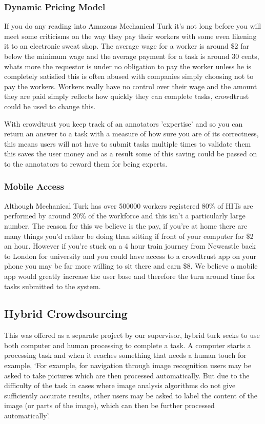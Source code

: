 \documentclass[11pt]{article}
\begin{document}
\subsubsection{Dynamic Pricing Model}
If you do any reading into Amazons Mechanical Turk it's not long before you will meet some criticisms on the way they pay their workers with some
even likening it to an electronic sweat shop. The average wage for a worker is around \$2 far below the minimum wage and the average payment for 
a task is around 30 cents, whats more the requestor is under no obligation to pay the worker unless he is completely satisfied this is often abused
with companies simply choosing not to pay the workers. Workers really have no control over their wage and the amount they are paid simply 
reflects how quickly they can complete tasks, crowdtrust could be used to change this.

With crowdtrust you keep track of an annotators 'expertise' and so you can return an answer to a task with a measure of how sure you are of its
correctness, this means users will not have to submit tasks multiple times to validate them this saves the user money and as a result some of this
saving could be passed on to the annotators to reward them for being experts.   

\subsubsection{Mobile Access}
Although Mechanical Turk has over 500000 workers registered 80\% of HITs are performed by around 20\% of the workforce and this isn't a 
particularly large number. The reason for this we believe is the pay, if you're at home there are many things you'd rather be doing than sitting
if front of your computer for \$2 an hour. However if you're stuck on a 4 hour train journey from Newcastle back to London for university and
you could have access to a crowdtrust app on your phone you may be far more willing to sit there and earn \$8. We believe a mobile app would 
greatly increase the user base and therefore the turn around time for tasks submitted to the system. 

\subsection{Hybrid Crowdsourcing}
This was offered as a separate project by our supervisor, hybrid turk seeks to use both computer and human processing to complete a task. A computer starts a processing task and when it reaches something that needs a human touch for example, `For example, for navigation through image recognition users may be asked to take pictures which are then processed automatically. But due to the difficulty of the task in cases where image analysis algorithms do not give sufficiently accurate results, other users may be asked to label the content of the image (or parts of the image), which can then be further processed automatically'.
\end{document}
